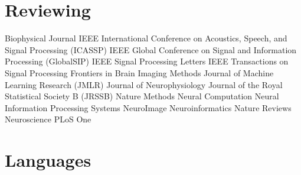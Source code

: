 \documentclass[10pt,colorlinks=true,urlcolor=blue]{moderncv}
\begin{document}
\section{Reviewing}
\cventry {} {Biophysical Journal} {}{}{}{}
\cventry {} {IEEE International Conference on Acoustics, Speech, and Signal Processing (ICASSP)} {}{}{}{}
\cventry {} {IEEE Global Conference on Signal and Information Processing (GlobalSIP)} {} {} {} {}
\cventry {} {IEEE Signal Processing Letters} {} {} {} {} 
\cventry {} {IEEE Transactions on Signal Processing} {}{}{}{}
\cventry {} {Frontiers in Brain Imaging Methods} {}{}{}{}
\cventry {} {Journal of Machine Learning Research (JMLR)} {}{}{}{}
\cventry {} {Journal of Neurophysiology} {}{}{}{}
\cventry {} {Journal of the Royal Statistical Society B (JRSSB)} {}{}{}{}
\cventry {} {Nature Methods} {}{}{}{}
\cventry {} {Neural Computation} {}{}{}{}
\cventry {} {Neural Information Processing Systems} {}{}{}{}
\cventry {} {NeuroImage} {}{}{}{}
\cventry {} {Neuroinformatics} {}{}{}{}
\cventry {} {Nature Reviews Neuroscience} {}{}{}{}
\cventry {} {PLoS One} {}{}{}{}


\section{Languages}
\end{document}
